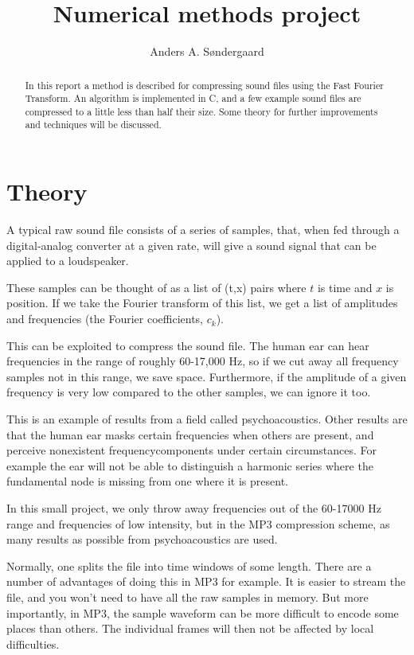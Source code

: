 \documentclass[a4paper,11pt]{article}
\author{Anders A. Søndergaard}
\title{Numerical methods project}
\begin{document}
\maketitle

\begin{abstract}
\noindent In this report a method is described for compressing sound files
using the Fast Fourier Transform. An algorithm is implemented in C,
and a few example sound files are compressed to a little less than half their
size. Some theory for further improvements and techniques
will be discussed.
\end{abstract}

\section{Theory}

A typical raw sound file consists of a series of samples,
that, when fed through a digital-analog converter at a given rate,
will give a sound signal that can be applied to a loudspeaker.

These samples can be thought of as a list of (t,x) pairs where $t$ is time and
$x$ is position.
If we take the Fourier transform of this list, we get
a list of amplitudes and frequencies (the Fourier coefficients, $c_k$).

This can be exploited to compress the sound file. The human ear
can hear frequencies in the range of roughly 60-17,000 Hz,
so if we cut away all frequency samples not in this range,
we save space. Furthermore, if the amplitude of a given frequency
is very low compared to the other samples, we can ignore it too.

This is an example of results from a field called psychoacoustics.
Other results are that the human ear masks certain frequencies when others are present,
and perceive nonexistent frequencycomponents under certain circumstances.
For example the ear will not be able to distinguish
a harmonic series where the fundamental node is missing from
one where it is present.

In this small project, we only throw away frequencies out of the 60-17000 Hz
range and frequencies of low intensity, but in the MP3 compression scheme,
as many results as possible from psychoacoustics are used.

Normally, one splits the file into time windows of some length.
There are a number of advantages of doing this in MP3 for example.
It is easier to stream the file, and you won't need to have all the raw
samples in memory. But more importantly, in MP3, the
sample waveform can be more difficult to encode
some places than others. The individual frames will then not be
affected by local difficulties.
\end{document}
